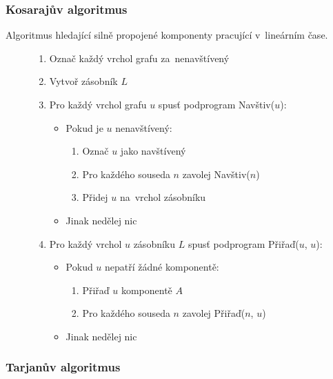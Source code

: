 \subsubsection{Kosarajův algoritmus}

Algoritmus hledající silně propojené komponenty pracující v~lineárním čase.

\begin{figure}[ht]
\onehalfspacing
\begin{enumerate}
\item Označ každý vrchol grafu za~nenavštívený
\item Vytvoř zásobník $L$
\item Pro každý vrchol grafu $u$ spusť podprogram Navštiv($u$):
    \begin{itemize}
    \item Pokud je $u$ nenavštívený:
        \begin{enumerate}
        \item Označ $u$ jako navštívený
        \item Pro každého souseda $n$ zavolej Navštiv($n$)
        \item Přidej $u$ na~vrchol zásobníku
        \end{enumerate}
    \item Jinak nedělej nic
    \end{itemize}
\item Pro každý vrchol $u$ zásobníku $L$ spusť podprogram Přiřaď($u$, $u$):
    \begin{itemize}
    \item Pokud $u$ nepatří žádné komponentě:
        \begin{enumerate}
        \item Přiřaď $u$ komponentě $A$
        \item Pro každého souseda $n$ zavolej Přiřaď($n$, $u$)
        \end{enumerate}
    \item Jinak nedělej nic
    \end{itemize}
\end{enumerate}
\end{figure}
\FloatBarrier

\subsubsection{Tarjanův algoritmus}

